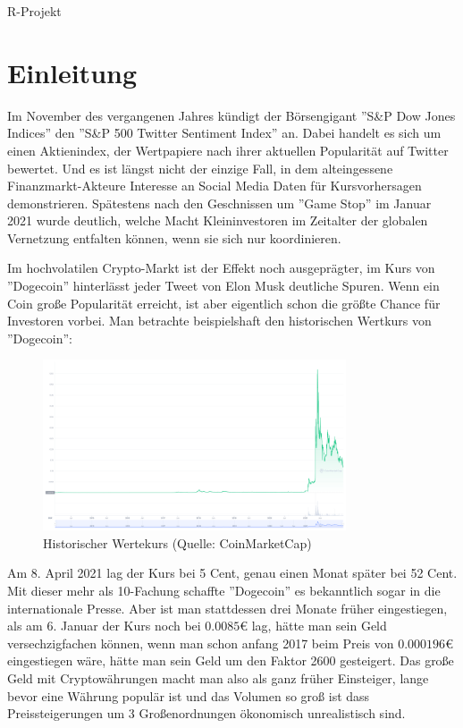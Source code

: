 \documentclass[12pt]{article}
\begin{document}
\begin{center}
    \begin{huge}
        R-Projekt
    \end{huge}
\end{center}

\section*{Einleitung}

Im November des vergangenen Jahres kündigt der Börsengigant ''S\&P Dow Jones Indices'' den ''S\&P 500 Twitter Sentiment Index'' an. Dabei handelt es sich um einen Aktienindex, der Wertpapiere nach ihrer aktuellen Popularität auf Twitter bewertet. Und es ist längst nicht der einzige Fall, in dem alteingessene Finanzmarkt-Akteure Interesse an Social Media Daten für Kursvorhersagen demonstrieren. Spätestens nach den Geschnissen um ''Game Stop'' im Januar 2021 wurde deutlich, welche Macht Kleininvestoren im Zeitalter der globalen Vernetzung entfalten können, wenn sie sich nur koordinieren.

Im hochvolatilen Crypto-Markt ist der Effekt noch ausgeprägter, im Kurs von ''Dogecoin'' hinterlässt jeder Tweet von Elon Musk deutliche Spuren. Wenn ein Coin große Popularität erreicht, ist aber eigentlich schon die größte Chance für Investoren vorbei. Man betrachte beispielshaft den historischen Wertkurs von ''Dogecoin'':

\begin{figure}[h]
    \centering
    \includegraphics[width=0.8\textwidth]{graphics/Dogecoin.png}
    \caption{Historischer Wertekurs (Quelle: CoinMarketCap)}
\end{figure}

Am 8. April 2021 lag der Kurs bei 5 Cent, genau einen Monat später bei 52 Cent. Mit dieser mehr als 10-Fachung schaffte ''Dogecoin'' es bekanntlich sogar in die internationale Presse. Aber ist man stattdessen drei Monate früher eingestiegen, als am 6. Januar der Kurs noch bei $0.0085 \euro{}$ lag, hätte man sein Geld versechzigfachen können, wenn man schon anfang 2017 beim Preis von $0.000196 \euro{}$ eingestiegen wäre, hätte man sein Geld um den Faktor 2600 gesteigert. Das große Geld mit Cryptowährungen macht man also als ganz früher Einsteiger, lange bevor eine Währung populär ist und das Volumen so groß ist dass Preissteigerungen um 3 Großenordnungen ökonomisch unrealistisch sind.
\end{document}
